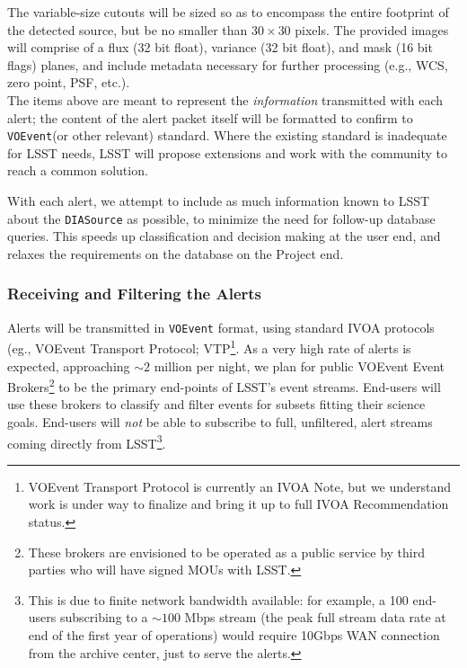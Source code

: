 \documentclass[12pt]{article}
\newcommand{\code}[1]{\texttt{#1}}
\newcommand{\DIASource}{\code{DIASource}\xspace}
\newcommand{\VOEvent}{\code{VOEvent}\xspace}
\begin{document}
The variable-size cutouts will be sized so as to encompass the entire footprint of the detected source, but be no smaller than $30 \times 30$ pixels. The provided images will comprise of a flux (32 bit float), variance (32 bit float), and mask (16 bit flags) planes, and include metadata necessary for further processing (e.g., WCS, zero point, PSF, etc.).
\\

The items above are meant to represent the {\em information} transmitted with each alert; the content of the alert packet itself will be formatted to confirm to \VOEvent (or other relevant) standard. Where the existing standard is inadequate for LSST needs, LSST will propose extensions and work with the community to reach a common solution.

With each alert, we attempt to include as much information known to LSST about the \DIASource as possible, to minimize the need for follow-up database queries. This speeds up classification and decision making at the user end, and relaxes the requirements on the database on the Project end.

\subsubsection{Receiving and Filtering the Alerts}
\label{sec:eventbrokers}

Alerts will be transmitted in \VOEvent format, using standard IVOA protocols (eg., VOEvent Transport Protocol; VTP\footnote{VOEvent Transport Protocol is currently an IVOA Note, but we understand work is under way to finalize and bring it up to full IVOA Recommendation status.}. As a very high rate of alerts is expected, approaching $\sim 2$ million per night, we plan for public VOEvent Event Brokers\footnote{These brokers are envisioned to be operated as a public service by third parties who will have signed MOUs with LSST.} to be the primary end-points of LSST's event streams. End-users will use these brokers to classify and filter events for subsets fitting their science goals. End-users will {\em not} be able to subscribe to full, unfiltered, alert streams coming directly from LSST\footnote{This is due to finite network bandwidth available: for example, a 100 end-users subscribing to a $\sim 100$ Mbps stream (the peak full stream data rate at end of the first year of operations) would require 10Gbps WAN connection from the archive center, just to serve the alerts.}.
\end{document}
